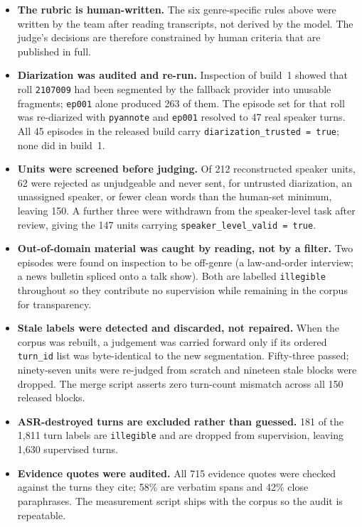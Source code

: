 \documentclass[11pt,a4paper]{article}
\begin{document}
\begin{itemize}[leftmargin=1.4em,itemsep=3pt,topsep=2pt]
  \item \textbf{The rubric is human-written.} The six genre-specific rules above were written by
  the team after reading transcripts, not derived by the model. The judge's decisions are
  therefore constrained by human criteria that are published in full.
  \item \textbf{Diarization was audited and re-run.} Inspection of build~1 showed that roll
  \texttt{2107009} had been segmented by the fallback provider into unusable fragments;
  \texttt{ep001} alone produced 263 of them. The episode set for that roll was re-diarized with
  \texttt{pyannote} and \texttt{ep001} resolved to 47 real speaker turns. All 45 episodes in the
  released build carry \texttt{diarization\_trusted = true}; none did in build~1.
  \item \textbf{Units were screened before judging.} Of 212 reconstructed speaker units, 62 were
  rejected as unjudgeable and never sent, for untrusted diarization, an unassigned speaker, or
  fewer clean words than the human-set minimum, leaving 150. A further three were withdrawn from the
  speaker-level task after review, giving the 147 units carrying
  \texttt{speaker\_level\_valid = true}.
  \item \textbf{Out-of-domain material was caught by reading, not by a filter.} Two episodes were
  found on inspection to be off-genre (a law-and-order interview; a news bulletin spliced onto a
  talk show). Both are labelled \texttt{illegible} throughout so they contribute no supervision
  while remaining in the corpus for transparency.
  \item \textbf{Stale labels were detected and discarded, not repaired.} When the corpus was
  rebuilt, a judgement was carried forward only if its ordered \texttt{turn\_id} list was
  byte-identical to the new segmentation. Fifty-three passed; ninety-seven units were re-judged
  from scratch and nineteen stale blocks were dropped. The merge script asserts zero turn-count
  mismatch across all 150 released blocks.
  \item \textbf{ASR-destroyed turns are excluded rather than guessed.} 181 of the 1{,}811 turn
  labels are \texttt{illegible} and are dropped from supervision, leaving 1{,}630 supervised
  turns.
  \item \textbf{Evidence quotes were audited.} All 715 evidence quotes were checked against the
  turns they cite; 58\% are verbatim spans and 42\% close paraphrases. The measurement script ships
  with the corpus so the audit is repeatable.
\end{itemize}
\end{document}
